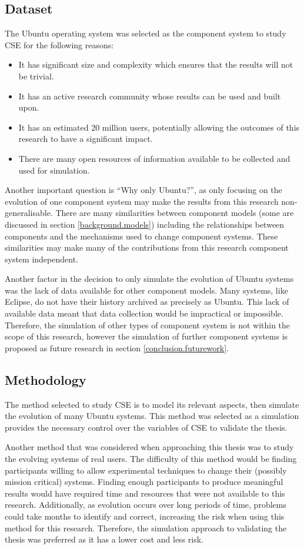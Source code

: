 \subsection{Dataset}
The Ubuntu operating system was selected as the component system to study CSE for the following reasons:
\begin{itemize}
  \item It has significant size and complexity which ensures that the results will not be trivial.
  \item It has an active research community whose results can be used and built upon.
  \item It has an estimated 20 million users, potentially allowing the outcomes of this research to have a significant impact.
  \item There are many open resources of information available to be collected and used for simulation.
\end{itemize} 

Another important question is ``Why only Ubuntu?'', 
as only focusing on the evolution of one component system may make the results from this research non-generalisable.
There are many similarities between component models (some are discussed in section \ref{background.models})
including the relationships between components and the mechanisms used to change component systems.
These similarities may make many of the contributions from this research component system independent.

Another factor in the decision to only simulate the evolution of Ubuntu systems was the lack of data available for other component models.
Many systems, like Eclipse, do not have their history archived as precisely as Ubuntu.
This lack of available data meant that data collection would be impractical or impossible.
Therefore, the simulation of other types of component system is not within the scope of this research,
however the simulation of further component systems is proposed as future research in section \ref{conclusion.futurework}.

\subsection{Methodology}
The method selected to study CSE is to model its relevant aspects, then simulate the evolution of many Ubuntu systems.
This method was selected as a simulation provides the necessary control over the variables of CSE to validate the thesis.

Another method that was considered when approaching this thesis was to study the evolving systems of real users.
The difficulty of this method would be finding participants willing to allow experimental techniques to change their (possibly mission critical) systems.
Finding enough participants to produce meaningful results would have required time and resources that were not available to this research.
Additionally, as evolution occurs over long periods of time, problems could take months to identify and correct, increasing the risk when using this method for this research. 
Therefore, the simulation approach to validating the thesis was preferred as it has a lower cost and less risk.

